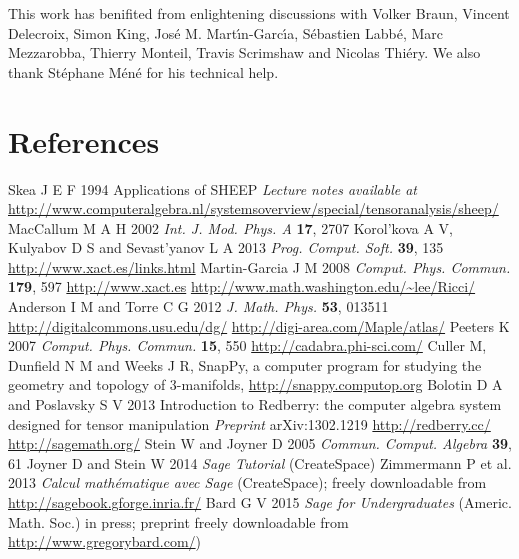 \documentclass[a4paper]{jpconf}
\begin{document}
 
\ack
This work has benifited from enlightening discussions with Volker Braun,
Vincent Delecroix, Simon King,  Jos\'e M. Mart\'\i n-Garc\'\i a, 
S\'ebastien Labb\'e,
Marc Mezzarobba, Thierry Monteil, Travis Scrimshaw and Nicolas Thi\'ery. 
We also thank St\'ephane M\'en\'e for his technical help. 
 


\section*{References}
\begin{thebibliography}{10}
Skea J E F 1994 Applications of SHEEP {\it Lecture notes available at}
\url{
http://www.computeralgebra.nl/systemsoverview/special/tensoranalysis/sheep/}
MacCallum M A H 2002 {\it Int. J. Mod. Phys. A} {\bf 17}, 2707 
Korol'kova A V, Kulyabov D S and Sevast'yanov L A 2013 {\it Prog. Comput. Soft.} 
{\bf 39}, 135
\url{http://www.xact.es/links.html}
Martin-Garcia J M 2008 {\it Comput. Phys. Commun.} {\bf 179}, 597
\url{http://www.xact.es}
\url{http://www.math.washington.edu/~lee/Ricci/}
Anderson I M and Torre C G 2012 {\it J. Math. Phys.} {\bf 53}, 013511
\url{http://digitalcommons.usu.edu/dg/}
\url{http://digi-area.com/Maple/atlas/}
Peeters K 2007 {\it Comput. Phys. Commun.} {\bf 15}, 550
\url{http://cadabra.phi-sci.com/}
Culler M, Dunfield N M and Weeks J R, SnapPy, a computer program for studying the geometry and topology of 3-manifolds, \url{http://snappy.computop.org}
Bolotin D A and Poslavsky S V 2013 Introduction to Redberry: the computer algebra system designed for tensor manipulation {\it Preprint} arXiv:1302.1219
\url{http://redberry.cc/}
\url{http://sagemath.org/}
Stein W and Joyner D 2005 {\it Commun. Comput. Algebra} {\bf 39}, 61
Joyner D and Stein W 2014 {\it Sage Tutorial} (CreateSpace)
Zimmermann P et al. 2013 {\it Calcul math\'ematique avec Sage} (CreateSpace); 
freely downloadable from \url{http://sagebook.gforge.inria.fr/}
Bard G V 2015 {\it Sage for Undergraduates} (Americ. Math. Soc.) in press;
preprint freely downloadable from \url{http://www.gregorybard.com/})
\end{thebibliography}
\end{document}

